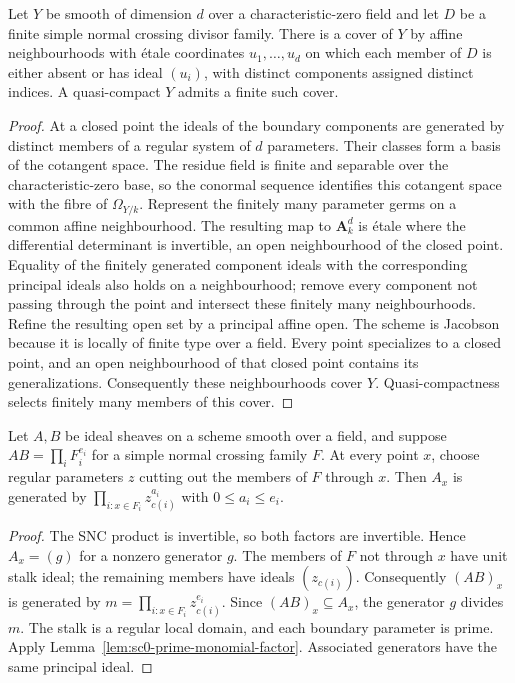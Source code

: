 \begin{lemma}\label{lem:sc0-snc-etale-charts}
\leanok
Let $Y$ be smooth of dimension $d$ over a characteristic-zero field and let $D$ be a finite
simple normal crossing divisor family. There is a cover of $Y$ by affine neighbourhoods with
\'etale coordinates $u_1,\ldots,u_d$ on which each member of $D$ is either absent or has ideal
$(u_i)$, with distinct components assigned distinct indices. A quasi-compact $Y$ admits a finite
such cover.
\end{lemma}
\begin{proof}
At a closed point the ideals of the boundary components are generated by distinct members
of a regular system of $d$ parameters. Their classes form a basis of the cotangent space.
The residue field is finite and separable over the characteristic-zero base, so the conormal
sequence identifies this cotangent space with the fibre of $\Omega_{Y/k}$. Represent the
finitely many parameter germs on a common affine neighbourhood. The resulting map to
$\mathbf A_k^d$ is \'etale where the differential determinant is invertible, an open neighbourhood
of the closed point.
Equality of the finitely generated component ideals with the corresponding principal ideals
also holds on a neighbourhood; remove every component not passing through the point and intersect
these finitely many neighbourhoods. Refine the resulting open set by a principal affine open.
The scheme is Jacobson because it is locally of finite type over a field. Every point specializes
to a closed point, and an open neighbourhood of that closed point contains its generalizations.
Consequently these neighbourhoods cover $Y$.
Quasi-compactness selects finitely many members of this cover.
\end{proof}

\begin{lemma}\label{lem:sc0-snc-factor-stalks}
\leanok
{}
Let $A,B$ be ideal sheaves on a scheme smooth over a field, and suppose
$AB=\prod_i F_i^{e_i}$ for a simple normal crossing family $F$. At every point $x$, choose
regular parameters $z$ cutting out the members of $F$ through $x$. Then $A_x$ is generated
by $\prod_{i:x\in F_i} z_{c(i)}^{a_i}$ with $0\le a_i\le e_i$.
\end{lemma}
\begin{proof}
The SNC product is invertible, so both factors are invertible. Hence $A_x=(g)$ for a nonzero
generator $g$. The members of $F$ not through $x$ have unit stalk ideal; the remaining members
have ideals $(z_{c(i)})$. Consequently $(AB)_x$ is generated by
$m=\prod_{i:x\in F_i}z_{c(i)}^{e_i}$. Since $(AB)_x\subseteq A_x$, the generator $g$ divides $m$.
The stalk is a regular local domain, and each boundary parameter is prime. Apply
Lemma~\ref{lem:sc0-prime-monomial-factor}. Associated generators have the same principal ideal.
\end{proof}

